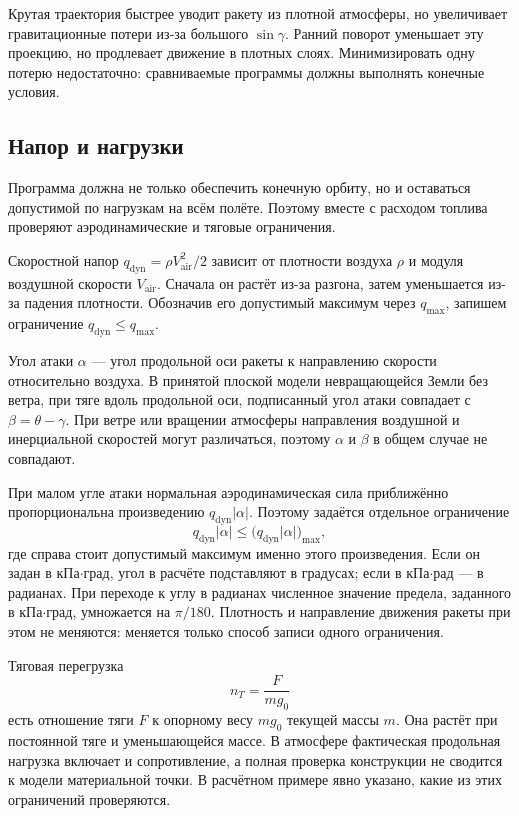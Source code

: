 \documentclass[a4paper,11pt]{article}
\numberwithin{equation}{section}
\begin{document}
Крутая траектория быстрее уводит ракету из плотной атмосферы,
но увеличивает гравитационные потери из-за большого $\sin\gamma$.
Ранний поворот уменьшает эту проекцию, но продлевает движение
в плотных слоях. Минимизировать одну потерю недостаточно:
сравниваемые программы должны выполнять конечные условия.

\subsection{Напор и нагрузки}

Программа должна не только обеспечить конечную орбиту,
но и оставаться допустимой по нагрузкам на всём полёте.
Поэтому вместе с расходом топлива проверяют аэродинамические
и тяговые ограничения.

Скоростной напор $q_{\mathrm{dyn}}=\rho V_{\mathrm{air}}^2/2$
зависит от плотности воздуха $\rho$ и модуля воздушной скорости
$V_{\mathrm{air}}$. Сначала он растёт из-за разгона,
затем уменьшается из-за падения плотности.
Обозначив его допустимый максимум через $q_{\max}$,
запишем ограничение $q_{\mathrm{dyn}}\le q_{\max}$.

Угол атаки $\alpha$ --- угол продольной оси ракеты
к направлению скорости относительно воздуха.
В принятой плоской модели невращающейся Земли без ветра,
при тяге вдоль продольной оси, подписанный угол атаки
совпадает с $\beta=\theta-\gamma$.
При ветре или вращении атмосферы направления воздушной
и инерциальной скоростей могут различаться,
поэтому $\alpha$ и $\beta$ в общем случае не совпадают.

При малом угле атаки нормальная аэродинамическая сила
приближённо пропорциональна произведению
$q_{\mathrm{dyn}}|\alpha|$. Поэтому задаётся отдельное ограничение
\[
q_{\mathrm{dyn}}|\alpha|\le
\bigl(q_{\mathrm{dyn}}|\alpha|\bigr)_{\max},
\]
где справа стоит допустимый максимум именно этого произведения.
Если он задан в кПа$\cdot$град, угол в расчёте подставляют
в градусах; если в кПа$\cdot$рад --- в радианах.
При переходе к углу в радианах численное значение предела,
заданного в кПа$\cdot$град, умножается на $\pi/180$.
Плотность и направление движения ракеты при этом не меняются:
меняется только способ записи одного ограничения.

Тяговая перегрузка
\begin{equation}
n_T=\frac{F}{mg_0}
\label{eq:thrust-load}
\end{equation}
есть отношение тяги $F$ к опорному весу $mg_0$ текущей массы $m$.
Она растёт при постоянной тяге и уменьшающейся массе.
В атмосфере фактическая продольная нагрузка включает
и сопротивление, а полная проверка конструкции
не сводится к модели материальной точки.
В расчётном примере явно указано, какие из этих ограничений проверяются.
\end{document}
